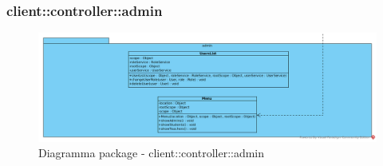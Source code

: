 \subsubsection{client::controller::admin}
\begin{center}
		\begin{figure}[H]
			\centering \includegraphics[scale=4, max width=\textwidth, max height=\myheight]{../img/diagrammiClassi/client/controller/admin.png}
			\caption{Diagramma package - client::controller::admin}
		\end{figure}
	\end{center}\hypertarget{client::controller::admin::UsersList}{}
